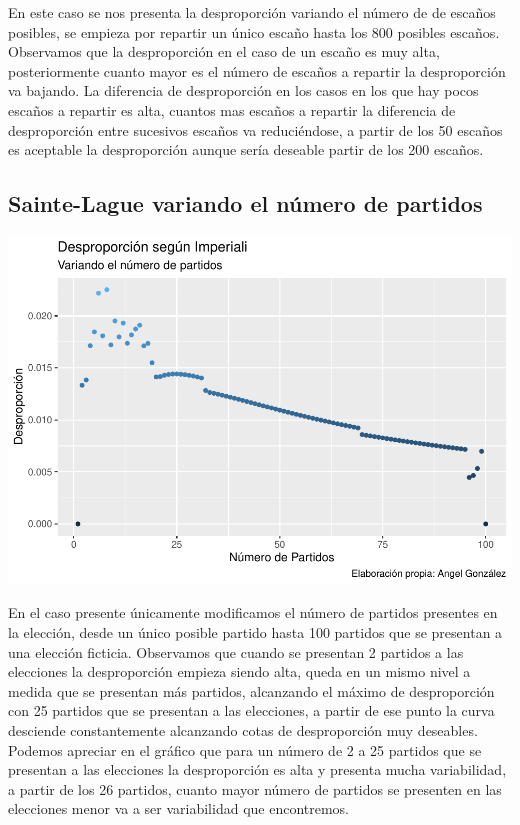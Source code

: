 \documentclass[12pt,a4paper,]{book}
\numberwithin{dummy}{section}
\theoremstyle{ocrenumbox}
\theoremstyle{blacknumex}
\theoremstyle{blacknumbox}
\theoremstyle{ocrenum}
\theoremstyle{ocrenum}
\begin{document}
En este caso se nos presenta la desproporción variando el número de de
escaños posibles, se empieza por repartir un único escaño hasta los 800
posibles escaños. Observamos que la desproporción en el caso de un
escaño es muy alta, posteriormente cuanto mayor es el número de escaños
a repartir la desproporción va bajando. La diferencia de desproporción
en los casos en los que hay pocos escaños a repartir es alta, cuantos
mas escaños a repartir la diferencia de desproporción entre sucesivos
escaños va reduciéndose, a partir de los 50 escaños es aceptable la
desproporción aunque sería deseable partir de los 200 escaños.

\hypertarget{sainte-lague-variando-el-nuxfamero-de-partidos}{%
\subsection{Sainte-Lague variando el número de
partidos}\label{sainte-lague-variando-el-nuxfamero-de-partidos}}

\begin{center}\includegraphics[width=0.95\linewidth]{figurasR/unnamed-chunk-22-1} \end{center}

En el caso presente únicamente modificamos el número de partidos
presentes en la elección, desde un único posible partido hasta 100
partidos que se presentan a una elección ficticia. Observamos que cuando
se presentan 2 partidos a las elecciones la desproporción empieza siendo
alta, queda en un mismo nivel a medida que se presentan más partidos,
alcanzando el máximo de desproporción con 25 partidos que se presentan a
las elecciones, a partir de ese punto la curva desciende constantemente
alcanzando cotas de desproporción muy deseables. Podemos apreciar en el
gráfico que para un número de 2 a 25 partidos que se presentan a las
elecciones la desproporción es alta y presenta mucha variabilidad, a
partir de los 26 partidos, cuanto mayor número de partidos se presenten
en las elecciones menor va a ser variabilidad que encontremos.
\end{document}
